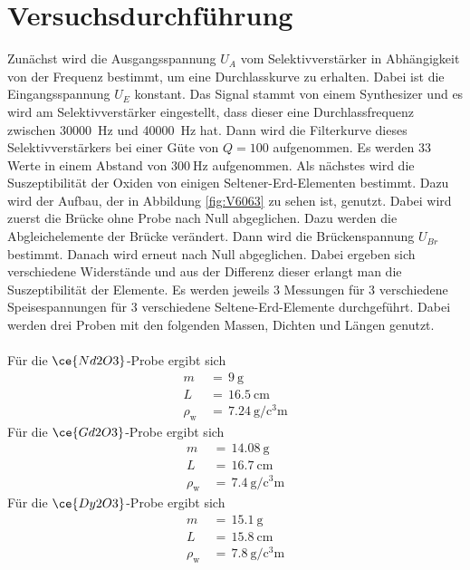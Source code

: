 \documentclass[
  bibliography=totoc,     %
  captions=tableheading,  %
  titlepage=firstiscover, %
]{scrartcl}
\begin{document}
\section{Versuchsdurchführung}
\label{sec:durchführung}
Zunächst wird die Ausgangsspannung $U_A$ vom Selektivverstärker in Abhängigkeit
von der Frequenz bestimmt, um eine Durchlasskurve zu erhalten. Dabei ist die
Eingangsspannung $U_E$ konstant. Das Signal stammt von einem Synthesizer und
es wird am Selektivverstärker eingestellt, dass dieser eine Durchlassfrequenz
zwischen \SI{30000}{\hertz} und \SI{40000}{\hertz} hat. Dann wird die
Filterkurve dieses Selektivverstärkers bei einer Güte von $Q=100$ aufgenommen.
Es werden 33 Werte in einem Abstand von $\SI{300}{\hertz}$ aufgenommen.
Als nächstes wird die Suszeptibilität der Oxiden von einigen
Seltener-Erd-Elementen bestimmt. Dazu wird der Aufbau, der in Abbildung
\ref{fig:V6063} zu sehen ist, genutzt. Dabei wird zuerst die Brücke ohne
Probe nach Null abgeglichen. Dazu werden die Abgleichelemente der Brücke
verändert. Dann wird die Brückenspannung $U_{Br}$ bestimmt. Danach wird
erneut nach Null abgeglichen. Dabei ergeben sich verschiedene Widerstände
und aus der Differenz dieser erlangt man die Suszeptibilität der Elemente.
Es werden jeweils 3 Messungen für 3 verschiedene Speisespannungen für 3
verschiedene Seltene-Erd-Elemente durchgeführt.
\noindent
Dabei werden drei Proben mit den folgenden Massen, Dichten und Längen genutzt. \\
\\
Für die $\ce{Nd2O3}$-Probe ergibt sich
\begin{align*}
  m\,&=\,\SI{9}{\gram} \\
  L\,&=\,\SI{16.5}{\centi\meter} \\
  \rho_\mathup{w}\,&=\,\SI{7.24}{\gram\per\cubic\centi\meter}
\end{align*}
Für die $\ce{Gd2O3}$-Probe ergibt sich
\begin{align*}
  m\,&=\,\SI{14.08}{\gram} \\
  L\,&=\,\SI{16.7}{\centi\meter} \\
  \rho_\mathup{w}\,&=\,\SI{7.4}{\gram\per\cubic\centi\meter}
\end{align*}
Für die $\ce{Dy2O3}$-Probe ergibt sich
\begin{align*}
  m\,&=\,\SI{15.1}{\gram} \\
  L\,&=\,\SI{15.8}{\centi\meter} \\
  \rho_\mathup{w}\,&=\,\SI{7.8}{\gram\per\cubic\centi\meter}
\end{align*}
\end{document}
